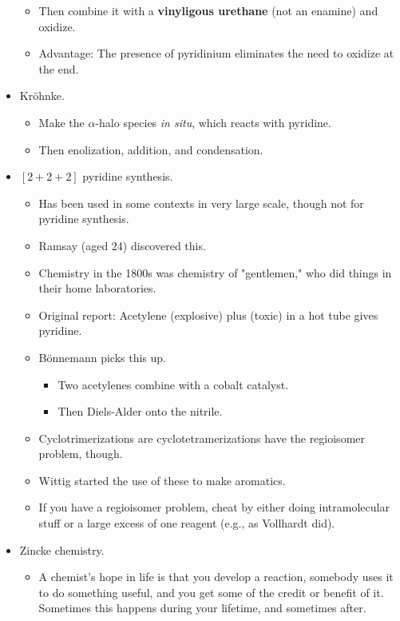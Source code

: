 \documentclass[../notes.tex]{subfiles}
\begin{document}
\begin{itemize}
\begin{itemize}
        \item Then combine it with a \textbf{vinyligous urethane} (not an enamine) and oxidize.
        \item Advantage: The presence of pyridinium eliminates the need to oxidize at the end.
    \end{itemize}
    \item Kr\"{o}hnke.
    \begin{itemize}
        \item Make the $\alpha$-halo species \emph{in situ}, which reacts with pyridine.
        \item Then enolization, addition, and condensation.
    \end{itemize}
    \item $[2+2+2]$ pyridine synthesis.
    \begin{itemize}
        \item Has been used in some contexts in very large scale, though not for pyridine synthesis.
        \item Ramsay (aged 24) discovered this.
        \item Chemistry in the 1800s was chemistry of "gentlemen," who did things in their home laboratories.
        \item Original report: Acetylene (explosive) plus  (toxic) in a hot tube gives pyridine.
        \item B\"{o}nnemann picks this up.
        \begin{itemize}
            \item Two acetylenes combine with a cobalt catalyst.
            \item Then Diels-Alder onto the nitrile.
        \end{itemize}
        \item Cyclotrimerizations are cyclotetramerizations have the regioisomer problem, though.
        \item Wittig started the use of these to make aromatics.
        \item If you have a regioisomer problem, cheat by either doing intramolecular stuff or a large excess of one reagent (e.g., as Vollhardt did).
    \end{itemize}
    \item Zincke chemistry.
    \begin{itemize}
        \item A chemist's hope in life is that you develop a reaction, somebody uses it to do something useful, and you get some of the credit or benefit of it. Sometimes this happens during your lifetime, and sometimes after.

\end{itemize}
\end{itemize}
\end{document}
